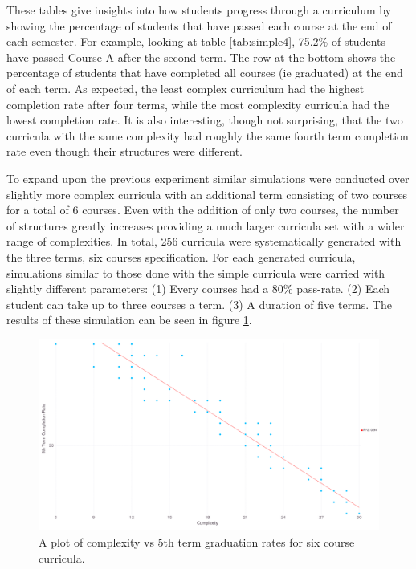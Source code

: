 \documentclass[botnum, fleqn]{unmeethesis}
\begin{document}
    These tables give insights into how students progress through a curriculum by showing the percentage of students that have passed each course at the end of each semester. For example, looking at table \ref{tab:simple4}, 75.2\% of students have passed Course A after the second term. The row at the bottom shows the percentage of students that have completed all courses (ie graduated) at the end of each term. As expected, the least complex curriculum had the highest completion rate after four terms, while the most complexity curricula had the lowest completion rate. It is also interesting, though not surprising, that the two curricula with the same complexity had roughly the same fourth term completion rate even though their structures were different.

    To expand upon the previous experiment similar simulations were conducted over slightly more complex curricula with an additional term consisting of two courses for a total of 6 courses. Even with the addition of only two courses, the number of structures greatly increases providing a much larger curricula set with a wider range of complexities. In total, 256 curricula were systematically generated with the three terms, six courses specification. For each generated curricula, simulations similar to those done with the simple curricula were carried with slightly different parameters: (1) Every courses had a 80\% pass-rate. (2) Each student can take up to three courses a term. (3) A duration of five terms. The results of these simulation can be seen in figure \ref{fig:gen6results}.

    \begin{figure}[h!]
      \centerline{\includegraphics[scale=0.25]{./figures/gradRate5_v_complexity_80.png}}
      \caption{A plot of complexity vs 5th term graduation rates for six course curricula.} 
      \label{fig:gen6results}
    \end{figure}
\end{document}

